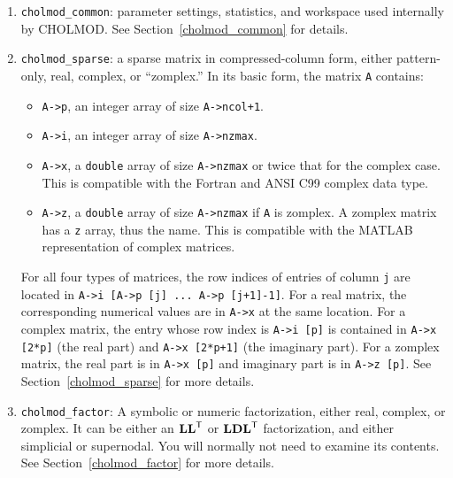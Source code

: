\documentclass[11pt]{article}
\newcommand{\m}[1]{{\bf{#1}}}       %
\newcommand{\tr}{^{\sf T}}          %
\begin{document}
\begin{enumerate}
\item {\tt cholmod\_common}:  parameter settings, statistics, and workspace
    used internally by CHOLMOD.
    See Section~\ref{cholmod_common} for details.

\item {\tt cholmod\_sparse}:  a sparse matrix in compressed-column form,
    either pattern-only, real, complex, or ``zomplex.''  In its basic form,
    the matrix {\tt A} contains:
    \begin{itemize}
	\item {\tt A->p}, an integer array of size {\tt A->ncol+1}.
	\item {\tt A->i}, an integer array of size {\tt A->nzmax}.
	\item {\tt A->x}, a {\tt double} array of size {\tt A->nzmax} or twice that for the complex case.
	    This is compatible with the Fortran and ANSI C99 complex data type.
	\item {\tt A->z}, a {\tt double} array of size {\tt A->nzmax} if {\tt A} is zomplex.
	    A zomplex matrix has a {\tt z} array, thus the name.
	    This is compatible with the MATLAB representation of complex matrices.
    \end{itemize}
    For all four types of matrices, the row indices of entries of column {\tt j}
    are located in {\tt A->i [A->p [j] ... A->p [j+1]-1]}.
    For a real matrix, the corresponding numerical values are in {\tt A->x} at the same location.
    For a complex matrix, the entry whose row index is {\tt A->i [p]} is contained in
	{\tt A->x [2*p]} (the real part) and {\tt A->x [2*p+1]} (the imaginary part).
    For a zomplex matrix, the real part is in {\tt A->x [p]} and imaginary part is in {\tt A->z [p]}.
    See Section~\ref{cholmod_sparse} for more details.

\item {\tt cholmod\_factor}:
    A symbolic or numeric factorization, either real, complex, or zomplex.
    It can be either an $\m{LL}\tr$ or $\m{LDL}\tr$ factorization, and either
    simplicial or supernodal.  You will normally not need to examine its contents.
    See Section~\ref{cholmod_factor} for more details.


\end{enumerate}
\end{document}
